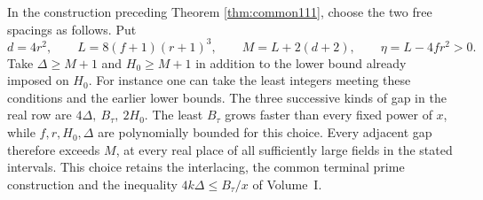 \documentclass[a4paper,11pt]{article}
\theoremstyle{definition}
\theoremstyle{remark}
\numberwithin{equation}{section}
\begin{document}
In the construction preceding Theorem \ref{thm:common111}, choose
the two free spacings as follows. Put
\[
 d=4r^2,\qquad L=8(f+1)(r+1)^3,\qquad
 M=L+2(d+2),\qquad \eta=L-4fr^2>0 .
\]
Take \(\Delta\ge M+1\) and \(H_0\ge M+1\) in addition to the
lower bound already imposed on \(H_0\). For instance one can
take the least integers meeting these conditions and the earlier
lower bounds. The three successive kinds of gap in the real row
are \(4\Delta,\ B_\tau,\ 2H_0\). The least \(B_\tau\) grows
faster than every fixed power of \(x\), while \(f,r,H_0,\Delta\)
are polynomially bounded for this choice. Every adjacent gap
therefore exceeds \(M\), at every real place of all sufficiently
large fields in the stated intervals. This choice retains the
interlacing, the common terminal prime construction and the
inequality \(4k\Delta\le B_\tau/x\) of Volume~I.
\end{document}
